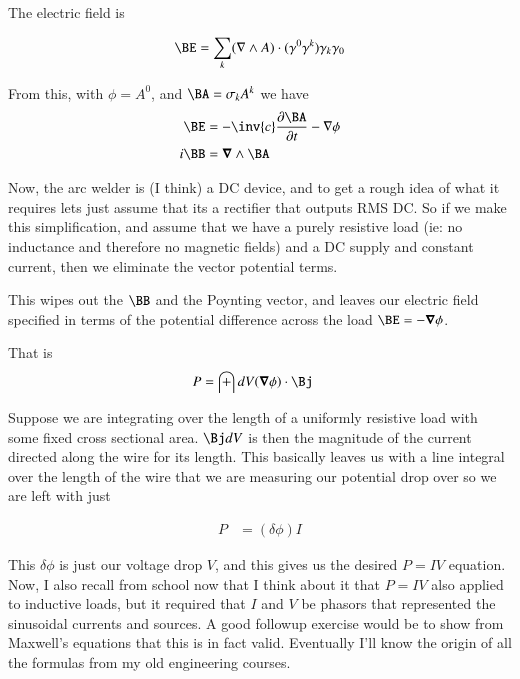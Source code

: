 \documentclass{article}
\begin{document}
The electric field is

\begin{align*}
\BE &= \sum_k (\grad \wedge A) \cdot (\gamma^0 \gamma^k) \gamma_k \gamma_0 \\
\end{align*}

From this, with $\phi = A^0$, and $\BA = \sigma_k A^k$ we have
\begin{align*}
\BE &= -\inv{c} \PD{t}{\BA} - \grad \phi \\
i\BB &= \spacegrad \wedge \BA
\end{align*}

Now, the arc welder is (I think) a DC device, and to 
get a rough idea of what it requires lets just assume that its a rectifier that outputs RMS DC.
So if we make this simplification, and assume that we have a 
purely resistive load (ie: no inductance and therefore no magnetic fields) and a DC supply and constant current, then
we eliminate the vector potential terms.

This wipes out the $\BB$ and the Poynting vector, and leaves our electric field specified in terms
of the potential difference across the load $\BE = -\spacegrad \phi$.

That is
\begin{align*}
P &= \int dV (\spacegrad \phi) \cdot \Bj
\end{align*}

Suppose we are integrating over the length of a uniformly resistive load with some fixed cross sectional area.  $\Bj dV$ is then the magnitude of the current directed along the wire for its length.  This basically leaves us with a line integral over the length of the wire that we are measuring our potential drop over so we are left with just

\begin{align*}
P &= (\delta \phi) I
\end{align*}

This $\delta \phi$ is just our voltage drop $V$, and this gives us the desired $P = I V$ equation.
Now, I also recall from school
now that I think about it that $P = I V$ also applied to inductive loads, but it required that $I$ and $V$ be phasors that
represented the sinusoidal currents and sources.  A good followup exercise would be to show from Maxwell's equations
that this is in fact valid.  Eventually I'll know the origin of all the formulas from my old engineering courses.

%
%
\end{document}
